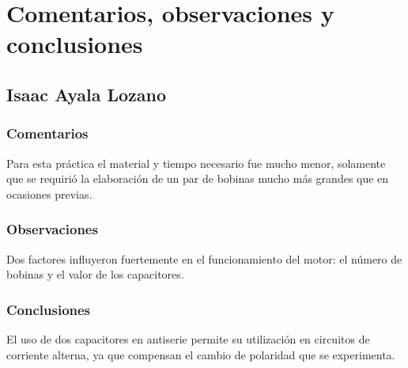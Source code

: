 \section{Comentarios, observaciones y conclusiones}
\subsection{Isaac Ayala Lozano}
\subsubsection{Comentarios}
Para esta pr\'actica el material y tiempo necesario fue mucho menor, solamente que se requiri\'o la elaboraci\'on
de un par de bobinas mucho m\'as grandes que en ocasiones previas.

\subsubsection{Observaciones}
Dos factores influyeron fuertemente en el funcionamiento del motor: el n\'umero de bobinas y el valor de los capacitores.

\subsubsection{Conclusiones}
El uso de dos capacitores en antiserie permite su utilizaci\'on en circuitos de corriente alterna, ya que compensan el
cambio de polaridad que se experimenta.